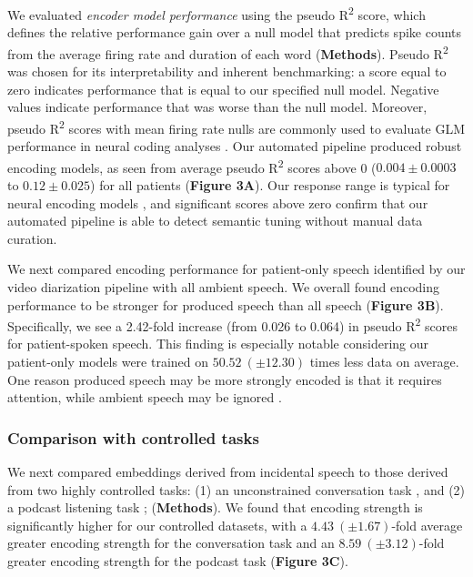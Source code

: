 \documentclass[pdflatex,sn-basic]{sn-jnl}%
\theoremstyle{thmstyleone}%
\theoremstyle{thmstyletwo}%
\theoremstyle{thmstylethree}%
\begin{document}
We evaluated \textit{encoder model performance} using the pseudo R\textsuperscript{{2}} score, which defines the relative performance gain over a null model that predicts spike counts from the average firing rate and duration of each word (\textbf{Methods}). Pseudo R\textsuperscript{{2}} was chosen for its interpretability and inherent benchmarking: a score equal to zero indicates performance that is equal to our specified null model. Negative values indicate performance that was worse than the null model. Moreover, pseudo R\textsuperscript{{2}} scores with mean firing rate nulls are commonly used to evaluate GLM performance in neural coding analyses \citep{bib57,bib58,bib59}. Our automated pipeline produced robust encoding models, as seen from average pseudo R\textsuperscript{{2}} scores above 0 ($0.004 \pm 0.0003$ to $0.12 \pm 0.025$) for all patients (\textbf{Figure 3A}). Our response range is typical for neural encoding models \citep{bib57,bib58,bib59}, and significant scores above zero confirm that our automated pipeline is able to detect semantic tuning without manual data curation.

We next compared encoding performance for patient-only speech identified by our video diarization pipeline with all ambient speech. We overall found encoding performance to be stronger for produced speech than all speech (\textbf{Figure 3B}). Specifically, we see a 2.42-fold increase (from 0.026 to 0.064) in pseudo R\textsuperscript{{2}} scores for patient-spoken speech. This finding is especially notable considering our patient-only models were trained on $50.52~(\pm 12.30)$ times less data on average. One reason produced speech may be more strongly encoded is that it requires attention, while ambient speech may be ignored \citep{bib35}.

\subsubsection{Comparison with controlled tasks}

We next compared embeddings derived from incidental speech to those derived from two highly controlled tasks: (1) an unconstrained conversation task \citep{bib53,bib49}, and (2) a podcast listening task \citep{bib4,bib48}; (\textbf{Methods}). We found that encoding strength is significantly higher for our controlled datasets, with a $4.43~(\pm 1.67)$-fold average greater encoding strength for the conversation task and an $8.59~(\pm 3.12)$-fold greater encoding strength for the podcast task (\textbf{Figure 3C}).
\end{document}
